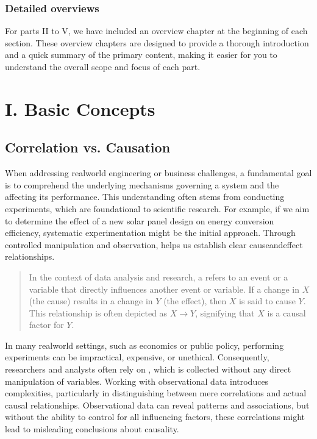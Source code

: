 \documentclass[letterpaper,10pt,english]{jupyterBook}
\begin{document}
\section{Detailed overviews}
\label{\detokenize{notebooks/guide:detailed-overviews}}
\sphinxAtStartPar
For parts II to V, we have included an overview chapter at the beginning of each section. These overview chapters are designed to provide a thorough introduction and a quick summary of the primary content, making it easier for you to understand the overall scope and focus of each part.

\sphinxstepscope


\part{I. Basic Concepts}

\sphinxstepscope


\chapter{Correlation vs. Causation}
\label{\detokenize{notebooks/correlation_vs_causation:correlation-vs-causation}}\label{\detokenize{notebooks/correlation_vs_causation::doc}}
\sphinxAtStartPar
When addressing real\sphinxhyphen{}world engineering or business challenges, a fundamental goal is to comprehend the underlying mechanisms governing a system and the  affecting its performance. This understanding often stems from conducting experiments, which are foundational to scientific research. For example, if we aim to determine the effect of a new solar panel design on energy conversion efficiency, systematic experimentation might be the initial approach. Through controlled manipulation and observation,  helps us establish clear cause\sphinxhyphen{}and\sphinxhyphen{}effect relationships.
\begin{quote}

\sphinxAtStartPar
In the context of data analysis and research, a  refers to an event or a variable that directly influences another event or variable. If a change in \(X\) (the cause) results in a change in \(Y\) (the effect), then \(X\) is said to cause \(Y\). This relationship is often depicted as \(X \rightarrow Y\), signifying that \(X\) is a causal factor for \(Y\).
\end{quote}

\sphinxAtStartPar
In many real\sphinxhyphen{}world settings, such as economics or public policy, performing experiments can be impractical, expensive, or unethical. Consequently, researchers and analysts often rely on , which is collected without any direct manipulation of variables. Working with observational data introduces complexities, particularly in distinguishing between mere correlations and actual causal relationships. Observational data can reveal patterns and associations, but without the ability to control for all influencing factors, these correlations might lead to misleading conclusions about causality.
\end{document}
